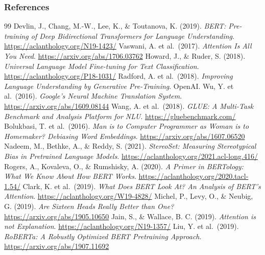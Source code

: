 \begin{vbframe}
\frametitle{References}
\footnotesize{
\begin{thebibliography}{99}
 Devlin, J., Chang, M.-W., Lee, K., \& Toutanova, K. (2019). \textit{BERT: Pre-training of Deep Bidirectional Transformers for Language Understanding}. \url{https://aclanthology.org/N19-1423/}
 Vaswani, A. et al.\ (2017). \textit{Attention Is All You Need}. \url{https://arxiv.org/abs/1706.03762}
 Howard, J., \& Ruder, S. (2018). \textit{Universal Language Model Fine-tuning for Text Classification}. \url{https://aclanthology.org/P18-1031/}
 Radford, A. et al.\ (2018). \textit{Improving Language Understanding by Generative Pre-Training}. OpenAI.
 Wu, Y. et al.\ (2016). \textit{Google's Neural Machine Translation System}. \url{https://arxiv.org/abs/1609.08144}
 Wang, A. et al.\ (2018). \textit{GLUE: A Multi-Task Benchmark and Analysis Platform for NLU}. \url{https://gluebenchmark.com/}
 Bolukbasi, T. et al.\ (2016). \textit{Man is to Computer Programmer as Woman is to Homemaker? Debiasing Word Embeddings}. \url{https://arxiv.org/abs/1607.06520}
 Nadeem, M., Bethke, A., \& Reddy, S. (2021). \textit{StereoSet: Measuring Stereotypical Bias in Pretrained Language Models}. \url{https://aclanthology.org/2021.acl-long.416/}
 Rogers, A., Kovaleva, O., \& Rumshisky, A. (2020). \textit{A Primer in BERTology: What We Know About How BERT Works}. \url{https://aclanthology.org/2020.tacl-1.54/}
 Clark, K. et al.\ (2019). \textit{What Does BERT Look At? An Analysis of BERT's Attention}. \url{https://aclanthology.org/W19-4828/}
 Michel, P., Levy, O., \& Neubig, G. (2019). \textit{Are Sixteen Heads Really Better than One?} \url{https://arxiv.org/abs/1905.10650}
 Jain, S., \& Wallace, B. C. (2019). \textit{Attention is not Explanation}. \url{https://aclanthology.org/N19-1357/}
 Liu, Y. et al.\ (2019). \textit{RoBERTa: A Robustly Optimized BERT Pretraining Approach}. \url{https://arxiv.org/abs/1907.11692}

\end{thebibliography}}
\end{vbframe}
